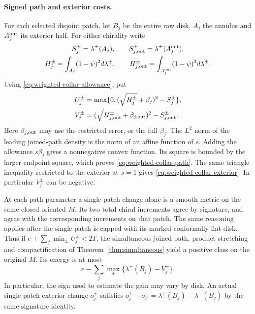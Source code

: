 \paragraph{Signed path and exterior costs.}
For each selected disjoint patch, let \(B_j\) be the entire raw
disk, \(A_j\) the annulus and \(A_j^{\rm out}\) its exterior half.
For either chirality write
\[
 \begin{gathered}
 S_j^\pm=\lambda^\pm(A_j),\qquad
 S_{j,{\rm out}}^\pm=\lambda^\pm(A_j^{\rm out}),\\
 H_j^\pm=\int_{A_j}(1-\psi)^2d\lambda^\pm,\qquad
 H_{j,{\rm out}}^\pm=\int_{A_j^{\rm out}}(1-\psi)^2d\lambda^\pm .
 \end{gathered}
\]
Using \eqref{eq:weighted-collar-allowance}, put
\begin{align}
 U_j^\pm&=\max\{0,(\sqrt{H_j^\pm}+\beta_j)^2-S_j^\pm\},
       \label{eq:weighted-collar-path}\\
 V_j^\pm&=(\sqrt{H_{j,{\rm out}}^\pm}+\beta_{j,{\rm out}})^2
                                      -S_{j,{\rm out}}^\pm .
       \label{eq:weighted-collar-exterior}
\end{align}
Here \(\beta_{j,{\rm out}}\) may use the restricted error, or the
full \(\beta_j\). The \(L^2\) norm of the leading joined-path density
is the norm of an affine function of \(s\). Adding the allowance
\(s\beta_j\) gives a nonnegative convex function. Its square is
bounded by the larger endpoint square, which proves
\eqref{eq:weighted-collar-path}. The same triangle inequality
restricted to the exterior at \(s=1\) gives
\eqref{eq:weighted-collar-exterior}. In particular \(V_j^\pm\)
can be negative.

At each path parameter a single-patch change alone is a smooth
metric on the same closed oriented \(M\). Its two total chiral
increments agree by signature, and agree with the corresponding
increments on that patch. The same reasoning applies after the
single patch is capped with its marked conformally flat disk.
Thus if
\(e+\sum_j\min_\pm U_j^\pm<2T\), the simultaneous joined path,
product stretching and compactification of
Theorem~\ref{thm:simultaneous} yield a positive class on the
original \(M\). Its energy is at most
\begin{equation}\label{eq:weighted-collar-gain}
 e-\sum_j\max_\pm\{\lambda^\pm(B_j)-V_j^\pm\}.
\end{equation}
In particular, the sign used to estimate the gain may vary by
disk. An actual single-patch exterior change \(o_j^\pm\)
satisfies \(o_j^+-o_j^-=\lambda^+(B_j)-\lambda^-(B_j)\)
by the same signature identity.

